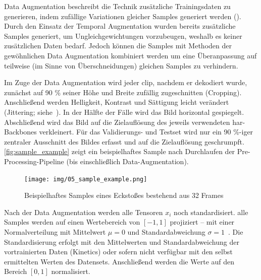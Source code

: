 Data Augmentation beschreibt die Technik zusätzliche Trainingsdaten zu generieren, indem zufällige Variationen gleicher Samples generiert werden (\cite{Gugger20}).
Durch den Einsatz der Temporal Augmentation wurden bereits zusätzliche Samples generiert, um Ungleichgewichtungen vorzubeugen, weshalb es keiner zusätzlichen Daten bedarf.
Jedoch können die Samples mit Methoden der gewöhnlichen Data Augmentation kombiniert werden um eine Überanpassung auf teilweise (im Sinne von Überschneidungen) gleichen Samples zu verhindern.

Im Zuge der Data Augmentation wird jeder \gls{clip}, nachdem er dekodiert wurde, zunächst auf 90 \% seiner Höhe und Breite zufällig zugeschnitten (Cropping).
Anschließend werden Helligkeit, Kontrast und Sättigung leicht verändert (Jittering; siehe~\cite{Tran18}).
In der Hälfte der Fälle wird das Bild horizontal gespiegelt.
Abschließend wird das Bild auf die Zielauflösung des jeweils verwendeten \gls{har}-Backbones verkleinert.
Für das Validierungs- und Testset wird nur ein 90 \%-iger zentraler Ausschnitt des Bildes erfasst und auf die Zielauflösung geschrumpft.
\autoref{fig:sample_example} zeigt ein beispielhaftes Sample nach Durchlaufen der Pre-Processing-Pipeline (bis einschließlich Data-Augmentation).

\begin{figure}
    \centering
    \texttt{[image: img/05\_sample\_example.png]}
    \caption{Beispielhaftes Samples eines Eckstoßes bestehend aus 32 Frames}
    \label{fig:sample_example}
\end{figure}

Nach der Data Augmentation werden alle Tensoren $x_i$ noch standardisiert.
\Dh alle Samples werden auf einen Wertebereich von $\left[ -1, 1\right]$ projiziert -- mit einer Normalverteilung mit Mittelwert $\mu = 0$ und Standardabweichung $\sigma = 1$~\cite{Burkov19}.
Die Standardisierung erfolgt mit den Mittelwerten und Standardabweichung der vortrainierten Daten (\zB Kinetics) oder sofern nicht verfügbar mit den selbst ermittelten Werten des Datensets.
Anschließend werden die Werte auf den Bereich $\left[0, 1\right]$ normalisiert.
